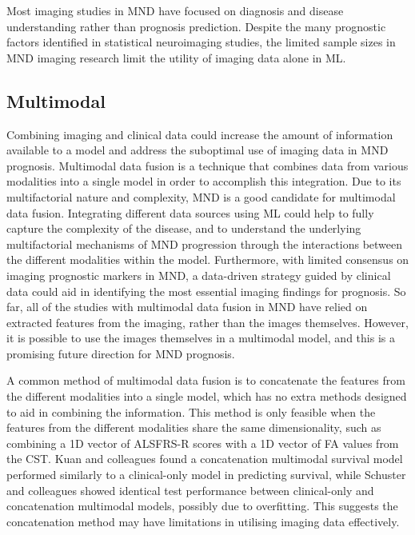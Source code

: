 Most imaging studies in MND have focused on diagnosis and disease understanding rather than prognosis prediction.
Despite the many prognostic factors identified in statistical neuroimaging studies, the limited sample sizes in MND imaging research limit the utility of imaging data alone in ML.

\subsection{Multimodal}

Combining imaging and clinical data could increase the amount of information available to a model and address the suboptimal use of imaging data in MND prognosis.
Multimodal data fusion is a technique that combines data from various modalities into a single model in order to accomplish this integration.
Due to its multifactorial nature and complexity, MND is a good candidate for multimodal data fusion.
Integrating different data sources using ML could help to fully capture the complexity of the disease, and to understand the underlying multifactorial mechanisms of MND progression through the interactions between the different modalities within the model.
Furthermore, with limited consensus on imaging prognostic markers in MND, a data-driven strategy guided by clinical data could aid in identifying the most essential imaging findings for prognosis.
So far, all of the studies with multimodal data fusion in MND have relied on extracted features from the imaging, rather than the images themselves.
However, it is possible to use the images themselves in a multimodal model, and this is a promising future direction for MND prognosis.

A common method of multimodal data fusion is to concatenate the features from the different modalities into a single model, which has no extra methods designed to aid in combining the information.
This method is only feasible when the features from the different modalities share the same dimensionality, such as combining a 1D vector of ALSFRS-R scores with a 1D vector of FA values from the CST.
Kuan and colleagues found a concatenation multimodal survival model performed similarly to a clinical-only model in predicting survival, while Schuster and colleagues showed identical test performance between clinical-only and concatenation multimodal models, possibly due to overfitting.
This suggests the concatenation method may have limitations in utilising imaging data effectively.

